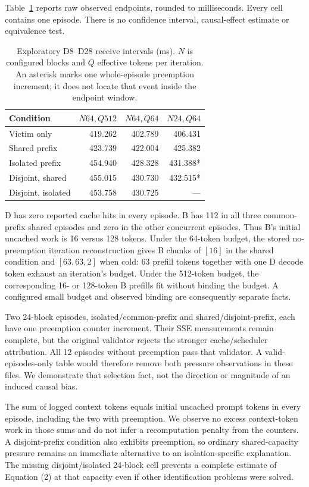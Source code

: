 \documentclass[a4paper,twoside]{article}
\begin{document}
Table~\ref{tab:pilot} reports raw observed endpoints, rounded to milliseconds. Every cell contains one episode. There is no confidence interval, causal-effect estimate or equivalence test.

\begin{table}[t]
\caption{Exploratory D8--D28 receive intervals (ms). $N$ is configured blocks and $Q$ effective tokens per iteration. An asterisk marks one whole-episode preemption increment; it does not locate that event inside the endpoint window.}
\label{tab:pilot}
\centering\small
\setlength{\tabcolsep}{4pt}
\begin{tabular}{lrrr}
\toprule
Condition & $N64,Q512$ & $N64,Q64$ & $N24,Q64$ \\
\midrule
Victim only & 419.262 & 402.789 & 406.431 \\
Shared prefix & 423.739 & 422.004 & 425.382 \\
Isolated prefix & 454.940 & 428.328 & 431.388* \\
Disjoint, shared & 455.015 & 430.730 & 432.515* \\
Disjoint, isolated & 453.758 & 430.725 & --- \\
\bottomrule
\end{tabular}
\end{table}

D has zero reported cache hits in every episode. B has 112 in all three common-prefix shared episodes and zero in the other concurrent episodes. Thus B's initial uncached work is 16 versus 128 tokens. Under the 64-token budget, the stored no-preemption iteration reconstruction gives B chunks of $[16]$ in the shared condition and $[63,63,2]$ when cold: 63 prefill tokens together with one D decode token exhaust an iteration's budget. Under the 512-token budget, the corresponding 16- or 128-token B prefills fit without binding the budget. A configured small budget and observed binding are consequently separate facts.

Two 24-block episodes, isolated/common-prefix and shared/disjoint-prefix, each have one preemption counter increment. Their SSE measurements remain complete, but the original validator rejects the stronger cache/scheduler attribution. All 12 episodes without preemption pass that validator. A valid-episodes-only table would therefore remove both pressure observations in these files. We demonstrate that selection fact, not the direction or magnitude of an induced causal bias.

The sum of logged context tokens equals initial uncached prompt tokens in every episode, including the two with preemption. We observe no excess context-token work in those sums and do not infer a recomputation penalty from the counters. A disjoint-prefix condition also exhibits preemption, so ordinary shared-capacity pressure remains an immediate alternative to an isolation-specific explanation. The missing disjoint/isolated 24-block cell prevents a complete estimate of Equation (2) at that capacity even if other identification problems were solved.
\end{document}

